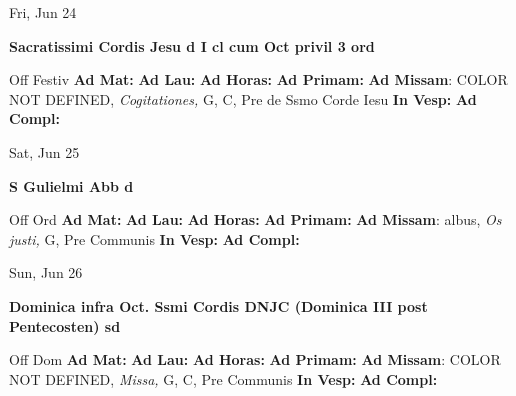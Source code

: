 \documentclass[10pt]{memoir}
\begin{document}
\begin{center}
\begin{minipage}{3.5in}
\vspace{2em}
\begin{center}Fri, Jun 24
\end{center}
\textbf{ \large Sacratissimi Cordis Jesu
\textnormal{\normalsize d I cl cum Oct privil 3 ord}}

\begin{justify}Off Festiv
\textbf{Ad Mat: }
\textbf{Ad Lau: }
\textbf{Ad Horas: }
\textbf{Ad Primam: }\textbf{Ad Missam}: COLOR NOT DEFINED, \textit{Cogitationes,} G, C, Pre de Ssmo Corde Iesu
\textbf{In Vesp: }
\textbf{Ad Compl: }
\end{justify}
\end{minipage}
\end{center}

\begin{center}
\begin{minipage}{3.5in}
\vspace{2em}
\begin{center}Sat, Jun 25
\end{center}
\textbf{ \large S Gulielmi Abb
\textnormal{\normalsize d}}

\begin{justify}Off Ord
\textbf{Ad Mat: }
\textbf{Ad Lau: }
\textbf{Ad Horas: }
\textbf{Ad Primam: }\textbf{Ad Missam}: albus, \textit{Os justi,} G, Pre Communis
\textbf{In Vesp: }
\textbf{Ad Compl: }
\end{justify}
\end{minipage}
\end{center}

\begin{center}
\begin{minipage}{3.5in}
\vspace{2em}
\begin{center}Sun, Jun 26
\end{center}
\textbf{ \large Dominica infra Oct. Ssmi Cordis DNJC (Dominica III post Pentecosten)
\textnormal{\normalsize sd}}

\begin{justify}Off Dom
\textbf{Ad Mat: }
\textbf{Ad Lau: }
\textbf{Ad Horas: }
\textbf{Ad Primam: }\textbf{Ad Missam}: COLOR NOT DEFINED, \textit{Missa,} G, C, Pre Communis
\textbf{In Vesp: }
\textbf{Ad Compl: }
\end{justify}
\end{minipage}
\end{center}
\end{document}
